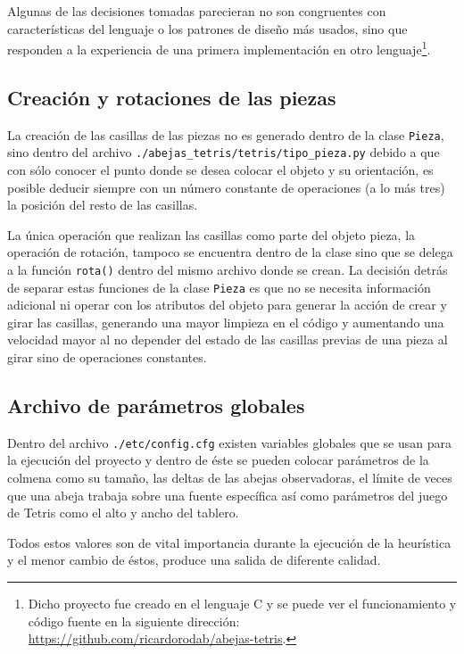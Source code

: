 Algunas de las decisiones tomadas parecieran no son congruentes con 
características del lenguaje o los patrones de diseño más usados, sino 
que responden a la experiencia de una primera implementación en otro 
lenguaje\footnote{Dicho proyecto fue creado en el lenguaje C y se puede ver 
el funcionamiento y código fuente en la siguiente dirección: 
\url{https://github.com/ricardorodab/abejas-tetris}.}.

\subsection{Creación y rotaciones de las piezas}

La creación de las casillas de las piezas no es generado dentro de la clase 
\texttt{Pieza}, sino dentro del archivo \texttt{./abejas\_tetris/tetris/tipo\_pieza.py} 
debido a que con sólo conocer el punto donde se desea colocar el objeto y su orientación, 
es posible deducir siempre con un número constante de operaciones (a lo más tres) la 
posición del resto de las casillas. 

La única operación que realizan las casillas como parte del objeto pieza, la 
operación de rotación, 
tampoco se encuentra dentro de la clase sino que se delega a la función 
\texttt{rota()} dentro del mismo archivo donde se crean. La decisión detrás de 
separar estas funciones de la clase \texttt{Pieza} es que no se necesita información adicional 
ni operar con los atributos del objeto para generar la acción de crear y 
girar las casillas, generando una mayor limpieza en el código y aumentando una 
velocidad mayor al no depender del estado de las casillas previas de una pieza al 
girar sino de operaciones constantes.

\subsection{Archivo de parámetros globales}

Dentro del archivo \texttt{./etc/config.cfg} existen variables globales que se 
usan para la ejecución del proyecto y dentro de éste se pueden colocar 
parámetros de la colmena como su tamaño, las deltas de las abejas observadoras, 
el límite de veces que una abeja trabaja sobre una fuente específica así como 
parámetros del juego de Tetris como el alto y ancho del tablero.

Todos estos valores son de vital importancia durante la ejecución de 
la heurística y el menor cambio de éstos, produce una salida de diferente calidad.

